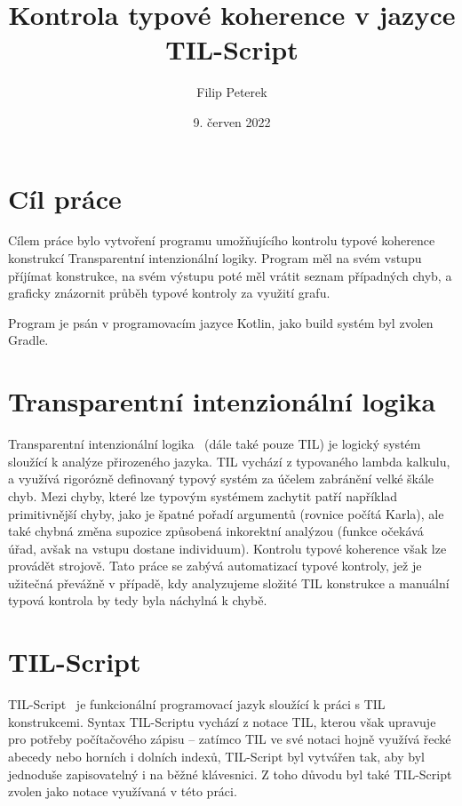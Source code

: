 \documentclass{article}
\title{Kontrola typové koherence v jazyce TIL-Script}
\author{Filip Peterek}
\date{9. červen 2022}
\begin{document}
\maketitle

\section{Cíl práce}

Cílem práce bylo vytvoření programu umožňujícího kontrolu typové koherence konstrukcí Transparentní
intenzionální logiky. Program měl na svém vstupu příjímat konstrukce, na svém výstupu poté měl
vrátit seznam případných chyb, a graficky znázornit průběh typové kontroly za využití grafu.

Program je psán v programovacím jazyce Kotlin, jako build systém byl zvolen Gradle.

\section{Transparentní intenzionální logika}

Transparentní intenzionální logika~\cite{til-duzi} (dále také pouze TIL) je logický systém sloužící
k analýze přirozeného jazyka. TIL vychází z typovaného lambda kalkulu, a využívá rigorózně definovaný
typový systém za účelem zabránění velké škále chyb. Mezi chyby, které lze typovým systémem zachytit
patří například primitivnější chyby, jako je špatné pořadí argumentů (rovnice počítá Karla), ale také
chybná změna supozice způsobená inkorektní analýzou (funkce očekává úřad, avšak na vstupu dostane
individuum). Kontrolu typové koherence však lze provádět strojově. Tato práce se zabývá automatizací
typové kontroly, jež je užitečná převážně v případě, kdy analyzujeme složité TIL konstrukce a manuální
typová kontrola by tedy byla náchylná k chybě.

\section{TIL-Script}

TIL-Script~\cite{til-script} je funkcionální programovací jazyk sloužící k práci s TIL konstrukcemi.
Syntax TIL-Scriptu vychází z notace TIL, kterou však upravuje pro potřeby počítačového zápisu -- zatímco
TIL ve své notaci hojně využívá řecké abecedy nebo horních i dolních indexů, TIL-Script byl vytvářen
tak, aby byl jednoduše zapisovatelný i na běžné klávesnici. Z toho důvodu byl také TIL-Script zvolen
jako notace využívaná v této práci.
\end{document}
